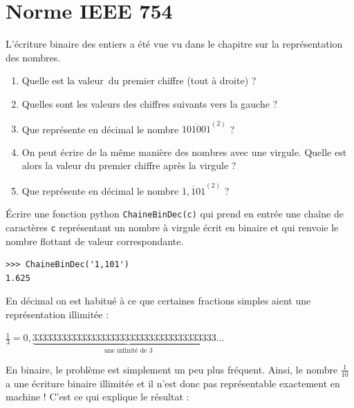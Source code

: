 \section{Norme IEEE 754}

\exercice{}

L'écriture binaire des entiers a été vue vu dans le chapitre sur la représentation des nombres.

\begin{enumerate}
  \item Quelle est la \og valeur\fg \ du premier chiffre (tout à droite) ?
  
  \item Quelles sont les valeurs des chiffres suivants vers la gauche ?
  
  \item Que représente en décimal le nombre $\overline{101001}^{(2)}$ ?
  
  \item On peut écrire de la même manière des nombres avec une virgule. Quelle est alors la valeur du premier chiffre après la virgule ?
  
  \item Que représente en décimal le nombre $\overline{1,101}^{(2)}$ ?
\end{enumerate}


\exercice{}

\'Ecrire une fonction python \verb+ChaineBinDec(c)+ qui prend en entrée une chaîne de caractères \verb+c+ représentant un nombre à virgule écrit en binaire et qui renvoie le nombre flottant de valeur correspondante.

\begin{lstlisting}
>>> ChaineBinDec('1,101')
1.625
\end{lstlisting}

En décimal on est habitué à ce que certaines fractions simples aient une représentation illimitée : 

\begin{center}
$\frac{1}{3} =  0,\underbrace{33333333333333333333333333333333333333...}_{\text{une infinité de 3}}$
\end{center}

En binaire, le problème est simplement un peu plus fréquent. Ainsi, le nombre $\textstyle \frac 1{10}$ a une écriture binaire illimitée et il n'est donc pas représentable exactement en machine ! C'est ce qui explique le résultat :
\smallskip

